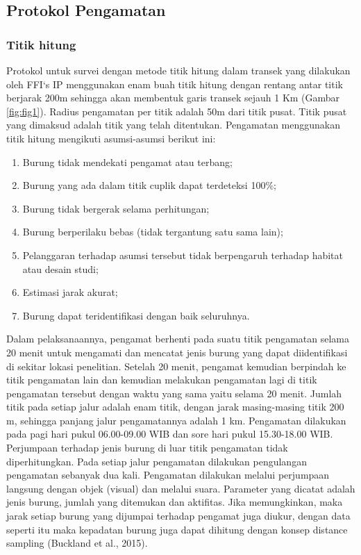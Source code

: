\documentclass[
]{book}
\providecommand{\tightlist}{%
  \setlength{\itemsep}{0pt}\setlength{\parskip}{0pt}}
\begin{document}
\hypertarget{protokol-pengamatan}{%
\subsection*{Protokol Pengamatan}\label{protokol-pengamatan}}

\hypertarget{titik-hitung}{%
\subsubsection*{Titik hitung}\label{titik-hitung}}

Protokol untuk survei dengan metode titik hitung dalam transek yang dilakukan oleh FFI`s IP menggunakan enam buah titik hitung dengan rentang antar titik berjarak 200m sehingga akan membentuk garis transek sejauh 1 Km (Gambar \ref{fig:fig1}). Radius pengamatan per titik adalah 50m dari titik pusat. Titik pusat yang dimaksud adalah titik yang telah ditentukan. Pengamatan menggunakan titik hitung mengikuti asumsi-asumsi berikut ini:

\begin{enumerate}
\def\labelenumi{\arabic{enumi}.}
\tightlist
\item
  Burung tidak mendekati pengamat atau terbang;
\item
  Burung yang ada dalam titik cuplik dapat terdeteksi 100\%;
\item
  Burung tidak bergerak selama perhitungan;
\item
  Burung berperilaku bebas (tidak tergantung satu sama lain);
\item
  Pelanggaran terhadap asumsi tersebut tidak berpengaruh terhadap habitat atau desain studi;
\item
  Estimasi jarak akurat;
\item
  Burung dapat teridentifikasi dengan baik seluruhnya.
\end{enumerate}

Dalam pelaksanaannya, pengamat berhenti pada suatu titik pengamatan selama 20 menit untuk mengamati dan mencatat jenis burung yang dapat diidentifikasi di sekitar lokasi penelitian. Setelah 20 menit, pengamat kemudian berpindah ke titik pengamatan lain dan kemudian melakukan pengamatan lagi di titik pengamatan tersebut dengan waktu yang sama yaitu selama 20 menit. Jumlah titik pada setiap jalur adalah enam titik, dengan jarak masing-masing titik 200 m, sehingga panjang jalur pengamatannya adalah 1 km. Pengamatan dilakukan pada pagi hari pukul 06.00-09.00 WIB dan sore hari pukul 15.30-18.00 WIB. Perjumpaan terhadap jenis burung di luar titik pengamatan tidak diperhitungkan. Pada setiap jalur pengamatan dilakukan pengulangan pengamatan sebanyak dua kali. Pengamatan dilakukan melalui perjumpaan langsung dengan objek (visual) dan melalui suara. Parameter yang dicatat adalah jenis burung, jumlah yang ditemukan dan aktifitas. Jika memungkinkan, maka jarak setiap burung yang dijumpai terhadap pengamat juga diukur, dengan data seperti itu maka kepadatan burung juga dapat dihitung dengan konsep distance sampling (Buckland et al., 2015).
\end{document}
